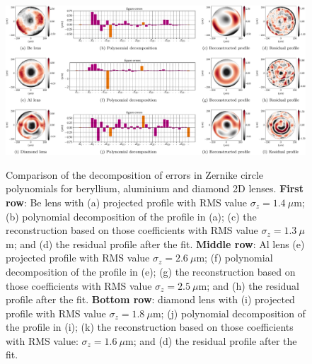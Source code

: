 \begin{refsection}
\begin{figure}[t]
        \centering
        {\includegraphics[width=1.\linewidth]{figures/ch04/metrology_zernike_profiles.pdf}}
        \caption[Other sources of deviations from the parabolic shape]{Comparison of the decomposition of errors in Zernike circle polynomials for beryllium, aluminium and diamond 2D lenses. \textbf{First row}: Be lens with (a) projected profile with RMS value $\sigma_z=1.4~\mu$m; (b) polynomial decomposition of the profile in (a); (c) the reconstruction based on those coefficients with RMS value $\sigma_z=1.3~\mu$m; and (d) the residual profile after the fit. \textbf{Middle row}: Al lens (e) projected profile with RMS value $\sigma_z=2.6~\mu$m; (f) polynomial decomposition of the profile in (e); (g) the reconstruction based on those coefficients with RMS value $\sigma_z=2.5~\mu$m; and (h) the residual profile after the fit. \textbf{Bottom row}: diamond lens with (i) projected profile with RMS value $\sigma_z=1.8~\mu$m; (j) polynomial decomposition of the profile in (i); (k) the reconstruction based on those coefficients with RMS value: $\sigma_z=1.6~\mu$m; and (d) the residual profile after the fit.}
        \label{fig:metrology_zernike_profiles}
\end{figure}


\end{refsection}
